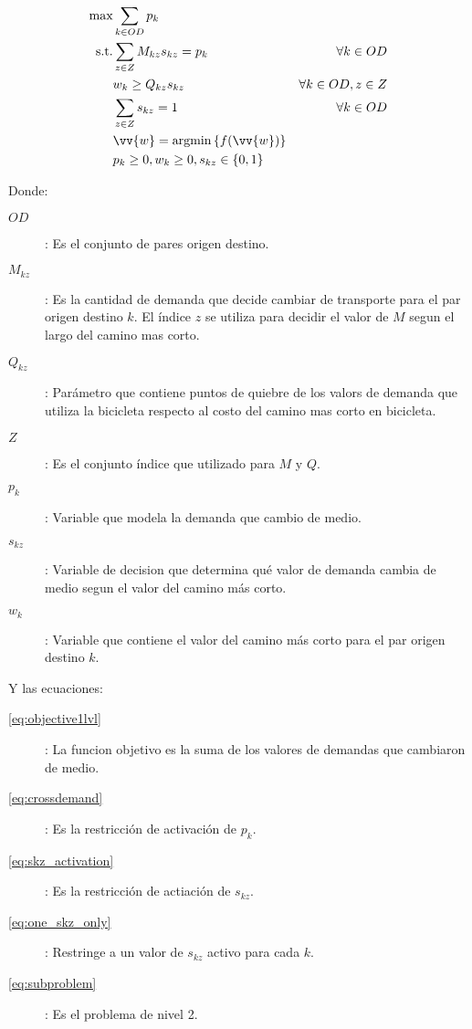 \documentclass{article}
\begin{document}
  \begin{align}
    \text{max}  & \sum_{k \in OD} p_k                               & \label{eq:objective1lvl} \\
    \text{s.t.} & \sum_{z \in Z} M_{kz} s_{kz} = p_k                & \forall k \in OD \label{eq:crossdemand} \\
                &  w_k \geq Q_{kz} s_{kz}                           & \forall k \in OD, z \in Z \label{eq:skz_activation} \\
                & \sum_{z \in Z} s_{kz} = 1                         & \forall k \in OD \label{eq:one_skz_only} \\
                & \vv{w} = \text{argmin} \left\{ f(\vv{w}) \right\} & \label{eq:subproblem} \\
                & p_k \geq 0, w_k \geq 0, s_{kz} \in \left\{ 0, 1 \right\} & \nonumber
  \end{align}

  Donde:

  \begin{description}
    \item[$OD$]: Es el conjunto de pares origen destino.
    \item[$M_{kz}$]: Es la cantidad de demanda que decide cambiar de transporte para el par origen destino $k$. El índice $z$ se utiliza para decidir el valor de $M$ segun el largo del camino mas corto.
    \item[$Q_{kz}$]: Parámetro que contiene puntos de quiebre de los valors de demanda que utiliza la bicicleta respecto al costo del camino mas corto en bicicleta.
    \item[$Z$]: Es el conjunto índice que utilizado para $M$ y $Q$.
    \item[$p_k$]: Variable que modela la demanda que cambio de medio.
    \item[$s_{kz}$]: Variable de decision que determina qué valor de demanda cambia de medio segun el valor del camino más corto.
    \item[$w_k$]: Variable que contiene el valor del camino más corto para el par origen destino $k$.  
  \end{description}

  Y las ecuaciones:

  \begin{description}
    \item[\ref{eq:objective1lvl}]: La funcion objetivo es la suma de los valores de demandas que cambiaron de medio.
    \item[\ref{eq:crossdemand}]: Es la restricción de activación de $p_k$.
    \item[\ref{eq:skz_activation}]: Es la restricción de actiación de $s_{kz}$.
    \item[\ref{eq:one_skz_only}]: Restringe a un valor de $s_{kz}$ activo para cada $k$.
    \item[\ref{eq:subproblem}]: Es el problema de nivel 2.
  \end{description}
\end{document}
